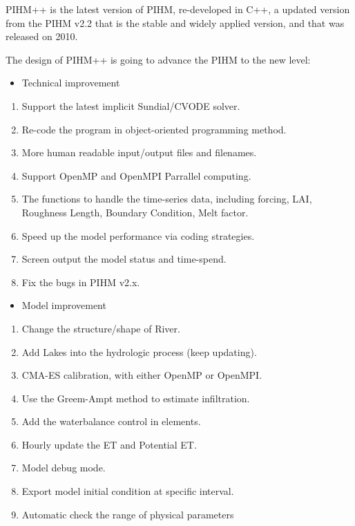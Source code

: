 \documentclass[]{scrbook}
\providecommand{\tightlist}{%
  \setlength{\itemsep}{0pt}\setlength{\parskip}{0pt}}
\begin{document}
PIHM++ is the latest version of PIHM, re-developed in C++, a updated
version from the PIHM v2.2 that is the stable and widely applied
version, and that was released on 2010.

The design of PIHM++ is going to advance the PIHM to the new level:

\begin{itemize}
\tightlist
\item
  Technical improvement
\end{itemize}

\begin{enumerate}
\def\labelenumi{\arabic{enumi}.}
\tightlist
\item
  Support the latest implicit Sundial/CVODE solver.
\item
  Re-code the program in object-oriented programming method.
\item
  More human readable input/output files and filenames.
\item
  Support OpenMP and OpenMPI Parrallel computing.
\item
  The functions to handle the time-series data, including forcing, LAI,
  Roughness Length, Boundary Condition, Melt factor.
\item
  Speed up the model performance via coding strategies.
\item
  Screen output the model status and time-spend.
\item
  Fix the bugs in PIHM v2.x.
\end{enumerate}

\begin{itemize}
\tightlist
\item
  Model improvement
\end{itemize}

\begin{enumerate}
\def\labelenumi{\arabic{enumi}.}
\tightlist
\item
  Change the structure/shape of River.
\item
  Add Lakes into the hydrologic process (keep updating).
\item
  CMA-ES calibration, with either OpenMP or OpenMPI.
\item
  Use the Greem-Ampt method to estimate infiltration.
\item
  Add the waterbalance control in elements.
\item
  Hourly update the ET and Potential ET.
\item
  Model debug mode.
\item
  Export model initial condition at specific interval.
\item
  Automatic check the range of physical parameters
\end{enumerate}
\end{document}
